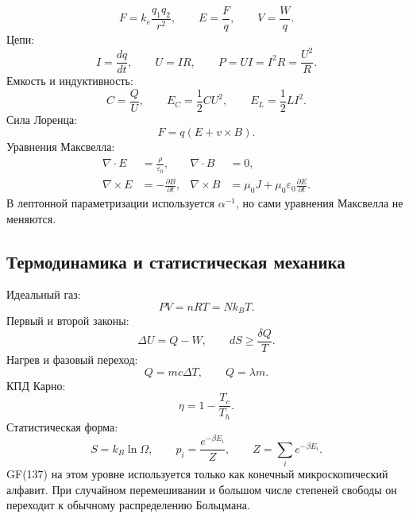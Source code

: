\documentclass[11pt]{article}
\begin{document}
\begin{equation}
    F=k_e\frac{q_1q_2}{r^2},\qquad
    E=\frac{F}{q},\qquad
    V=\frac{W}{q}.
\end{equation}
Цепи:
\begin{equation}
    I=\frac{dq}{dt},\qquad
    U=IR,\qquad
    P=UI=I^2R=\frac{U^2}{R}.
\end{equation}
Емкость и индуктивность:
\begin{equation}
    C=\frac{Q}{U},\qquad
    E_C=\frac{1}{2}CU^2,\qquad
    E_L=\frac{1}{2}LI^2.
\end{equation}
Сила Лоренца:
\begin{equation}
    F=q(E+v\times B).
\end{equation}
Уравнения Максвелла:
\begin{align}
    \nabla\cdot E&=\frac{\rho}{\varepsilon_0},&
    \nabla\cdot B&=0,\\
    \nabla\times E&=-\frac{\partial B}{\partial t},&
    \nabla\times B&=\mu_0J+\mu_0\varepsilon_0\frac{\partial E}{\partial t}.
\end{align}
В лептонной параметризации используется $\alpha^{-1}$, но сами уравнения
Максвелла не меняются.

\subsection{Термодинамика и статистическая механика}

Идеальный газ:
\begin{equation}
    PV=nRT=Nk_BT.
\end{equation}
Первый и второй законы:
\begin{equation}
    \Delta U=Q-W,\qquad
    dS\ge \frac{\delta Q}{T}.
\end{equation}
Нагрев и фазовый переход:
\begin{equation}
    Q=mc\Delta T,\qquad
    Q=\lambda m.
\end{equation}
КПД Карно:
\begin{equation}
    \eta=1-\frac{T_c}{T_h}.
\end{equation}
Статистическая форма:
\begin{equation}
    S=k_B\ln\Omega,\qquad
    p_i=\frac{e^{-\beta E_i}}{Z},\qquad
    Z=\sum_i e^{-\beta E_i}.
\end{equation}
GF(137) на этом уровне используется только как конечный микроскопический
алфавит.  При случайном перемешивании и большом числе степеней свободы он
переходит к обычному распределению Больцмана.
\end{document}
